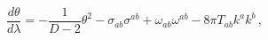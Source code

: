 \begin{equation}
\frac{d\theta}{d\lambda} = -\frac{1}{D-2} \theta^2 - \sigma_{ab}
\sigma^{ab} + \omega_{ab} \omega^{ab} - 8 \pi T_{ab} k^a k^b\, ,
\label{eqray}
\end{equation}

